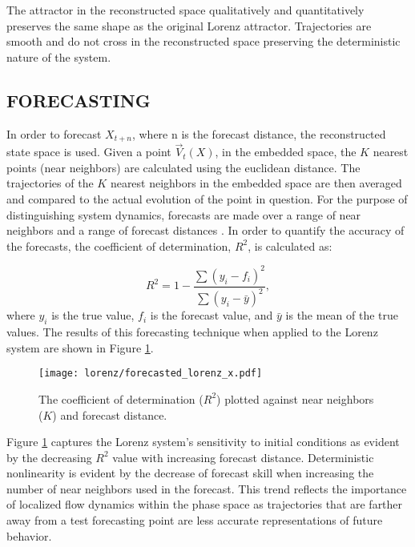 The attractor in the reconstructed space qualitatively and quantitatively preserves the same shape as the original Lorenz attractor. Trajectories are smooth and do not cross in the reconstructed space preserving the deterministic nature of the system.

\subsection{FORECASTING}

In order to forecast $X_{t+n}$, where n is the forecast distance, the reconstructed state space is used. Given a point  $\vec V_t(X)$, in the embedded space, the $K$ nearest points (near neighbors) are calculated using the euclidean distance. The trajectories of the $K$ nearest neighbors in the embedded space are then averaged and compared to the actual evolution of the point in question.  For the purpose of distinguishing system dynamics, forecasts are made over a range of near neighbors and a range of forecast distances \cite{original_rubin}. In order to quantify the accuracy of the forecasts, the coefficient of determination, $R^2$, is calculated as:

$$ R^2 = 1 - \frac{\sum (y_i - f_i)^2} {\sum (y_i - \bar y)^2},$$
where $y_i$ is the true value, $f_i$ is the forecast value, and $\bar y$ is the mean of the true values. The results of this forecasting technique when applied to the Lorenz system are shown in Figure \ref{lorenz_contour}.


\begin{figure}[htbp]  %
   \centering
   \texttt{[image: lorenz/forecasted\_lorenz\_x.pdf]} 
   \caption{The coefficient of determination ($R^2$) plotted against near neighbors ($K$) and forecast distance.}
   \label{lorenz_contour}
\end{figure}

Figure \ref{lorenz_contour} captures the Lorenz system's sensitivity to initial conditions as evident by the decreasing $R^2$ value with increasing forecast distance.  Deterministic nonlinearity is evident by the decrease of forecast skill when increasing the number of near neighbors used in the forecast.  This trend reflects the importance of localized flow dynamics within the phase space as trajectories that are farther away from a test forecasting point are less accurate representations of future behavior.


